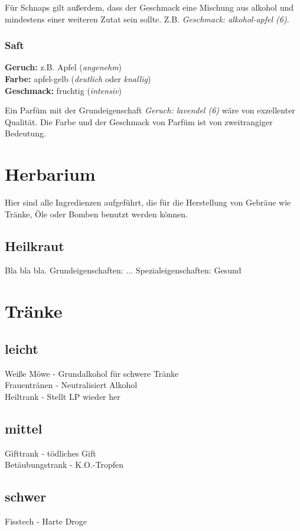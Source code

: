 Für Schnaps gilt außerdem, dass der Geschmack eine Mischung aus alkohol und mindestens einer weiteren Zutat sein sollte. Z.B. \textit{Geschmack: alkohol-apfel (6)}.

\subsubsection{Saft}
\textbf{Geruch:} z.B. Apfel (\textit{angenehm}) \\
\textbf{Farbe:} apfel-gelb (\textit{deutlich} oder \textit{knallig}) \\
\textbf{Geschmack:} fruchtig (\textit{intensiv})

Ein Parfüm mit der Grundeigenschaft \textit{Geruch: lavendel (6)} wäre von exzellenter Qualität. Die Farbe und der Geschmack von Parfüm ist von zweitrangiger Bedeutung.


\section{Herbarium}
Hier sind alle Ingredienzen aufgeführt, die für die Herstellung von Gebräue wie Tränke, Öle oder Bomben benutzt werden können.

\subsection{Heilkraut}
Bla bla bla.
Grundeigenschaften: ...
Spezialeigenschaften: Gesund

\section{Tränke}
\subsection{leicht}
Weiße Möwe - Grundalkohol für schwere Tränke \\
Frauentränen - Neutralisiert Alkohol \\
Heiltrank - Stellt LP wieder her \\

\subsection{mittel}
Gifttrank - tödliches Gift \\
Betäubungstrank - K.O.-Tropfen \\

\subsection{schwer}
Fisstech - Harte Droge \\


